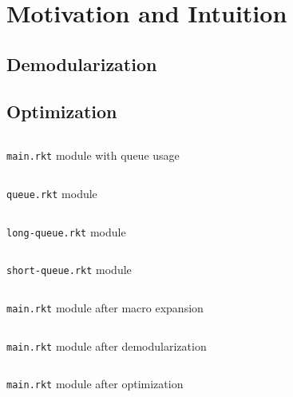 \chapter{Motivation and Intuition}
\section{Demodularization}
\section{Optimization}
\begin{listing}
  \inputminted{racket}{listings/main.rkt}
  \caption{\texttt{main.rkt} module with queue usage}
  \label{lst:main.rkt}
\end{listing}

\begin{listing}
  \inputminted{racket}{listings/queue.rkt}
  \caption{\texttt{queue.rkt} module}
  \label{lst:queue.rkt}
\end{listing}

\begin{listing}
  \inputminted{racket}{listings/long-queue.rkt}
  \caption{\texttt{long-queue.rkt} module}
  \label{lst:long-queue.rkt}
\end{listing}

\begin{listing}
  \inputminted{racket}{listings/short-queue.rkt}
  \caption{\texttt{short-queue.rkt} module}
  \label{lst:short-queue.rkt}
\end{listing}

\begin{listing}
  \inputminted{racket}{listings/main-expanded.rkt}
  \caption{\texttt{main.rkt} module after macro expansion}
  \label{lst:main-expanded.rkt}
\end{listing}

\begin{listing}
  \inputminted{racket}{listings/main-demodularized.rkt}
  \caption{\texttt{main.rkt} module after demodularization}
  \label{lst:main-demodularized.rkt}
\end{listing}

\begin{listing}
  \inputminted{racket}{listings/main-optimized.rkt}
  \caption{\texttt{main.rkt} module after optimization}
  \label{lst:main-optimized.rkt}
\end{listing}
